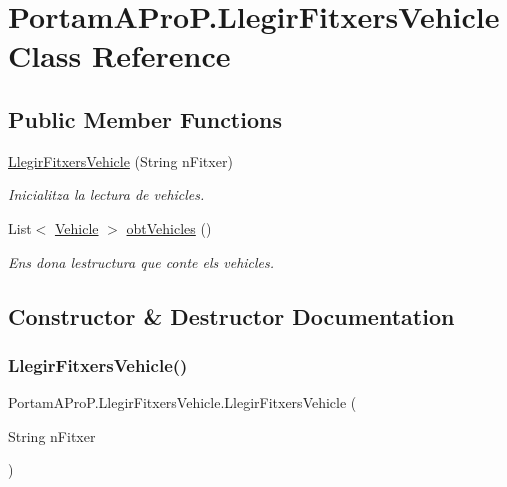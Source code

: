 \hypertarget{class_portam_a_pro_p_1_1_llegir_fitxers_vehicle}{}\section{Portam\+A\+Pro\+P.\+Llegir\+Fitxers\+Vehicle Class Reference}
\label{class_portam_a_pro_p_1_1_llegir_fitxers_vehicle}
\subsection*{Public Member Functions}
\begin{DoxyCompactItemize}
\item 
\hyperlink{class_portam_a_pro_p_1_1_llegir_fitxers_vehicle_a1960ebad928856ff439689ead7385bd3}{Llegir\+Fitxers\+Vehicle} (String n\+Fitxer)
\begin{DoxyCompactList}\small\item\em Inicialitza la lectura de vehicles. \end{DoxyCompactList}\item 
List$<$ \hyperlink{class_portam_a_pro_p_1_1_vehicle}{Vehicle} $>$ \hyperlink{class_portam_a_pro_p_1_1_llegir_fitxers_vehicle_ad64213b0f95e08a0c2709e44d807ed63}{obt\+Vehicles} ()
\begin{DoxyCompactList}\small\item\em Ens dona l\textquotesingle{}estructura que conte els vehicles. \end{DoxyCompactList}\end{DoxyCompactItemize}


\subsection{Constructor \& Destructor Documentation}
\mbox{\label{class_portam_a_pro_p_1_1_llegir_fitxers_vehicle_a1960ebad928856ff439689ead7385bd3}} 
\subsubsection{\texorpdfstring{Llegir\+Fitxers\+Vehicle()}{LlegirFitxersVehicle()}}
{\footnotesize\ttfamily Portam\+A\+Pro\+P.\+Llegir\+Fitxers\+Vehicle.\+Llegir\+Fitxers\+Vehicle (\begin{DoxyParamCaption}\item[{String}]{n\+Fitxer }\end{DoxyParamCaption})}



